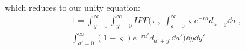which reduces to our unity equation:
\begin{equation}
\label{eq:ex2sexIPFunity3}
\begin{split}
1 = \int _{y=0}^\infty \int _{y'=0}^\infty IPF\Bigg(\tau\;,\;
 \int_{a=0}^\infty \varsigma e^{-ra}d_{a+y} \dd a\;, \\ 
 \int_{a'=0}^\infty (1-\varsigma) e^{-ra'}d_{a'+y'} \dd a'\Bigg) \dd y \dd
 y'
\end{split}
\end{equation}









